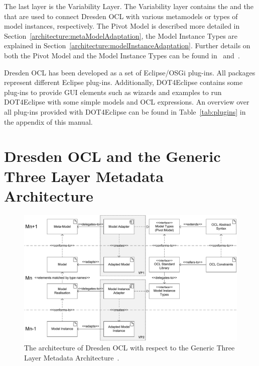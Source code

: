 The last layer is the Variability Layer. The Variability layer contains the
 and the  that are used to
connect Dresden OCL with various metamodels or types of model instances,
respectively. The Pivot Model is described more detailed in
Section~\ref{architecture:metaModelAdaptation}, the Model Instance Types are
explained in Section~\ref{architecture:modelInstanceAdaptation}. Further details
on both the Pivot Model and the Model Instance Types can be found 
in~\cite{braeuerEA:OCL2007} and~\cite{wilkeEA:MODELS2010}.

Dresden OCL has been developed as a set of Eclipse/\acs{OSGi} plug-ins. All
packages represent different Eclipse plug-ins. Additionally, \acl{DOT4Eclipse}
contains some plug-ins to provide \acs{GUI} elements such as wizards and 
examples to run \acl{DOT4Eclipse} with some simple models and \acs{OCL} 
expressions. An overview over all plug-ins provided with \acl{DOT4Eclipse} can
be found in Table~\ref{tab:plugins} in the appendix of this manual.



\section{Dresden OCL and the Generic Three La\-yer Me\-ta\-da\-ta Architecture}
\label{theory:DOTLayers}

\begin{figure}
	\centering
	\includegraphics[width=1.0\linewidth]{figures/architecture/modeladaptation}
	\caption{The architecture of Dresden OCL with respect to the Generic Three Layer
	Metadata Architecture~\cite{wilkeEA:MODELS2010}.}
	\label{pic:architecture:genericArchitecture}
\end{figure}

